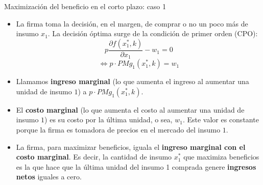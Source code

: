 \documentclass{beamer}
\theoremstyle{definition}
\begin{document}
\begin{frame}{Maximización del beneficio en el corto plazo: caso 1}\small
\begin{itemize}
	\item La firma toma la decisión, en el margen, de comprar o no un poco más de insumo $x_1$. La decisión óptima surge de la condición de primer orden (CPO):
	\begin{equation*}
	p\frac{\partial f(x_{1}^*,k)}{\partial x_{1}}-w_{1}=0
	\end{equation*}
	\begin{equation*}
	 \Leftrightarrow p\cdot PMg_{1}(x_1^*,k)=w_{1}
	\end{equation*}
	\item Llamamos \textbf{ingreso marginal} (lo que aumenta el ingreso al aumentar una unidad de insumo $1$) a $p\cdot PMg_{1}(x_1^*,k)$.
	\item El \textbf{costo marginal} (lo que aumenta el costo al aumentar una unidad de insumo $1$) es su costo por la última unidad, o sea, $w_1$. Este valor es constante porque la firma es tomadora de precios en el mercado del insumo $1$.
	\item La firma, para maximizar beneficios, iguala el \textbf{ingreso marginal con el costo marginal}. Es decir, la cantidad de insumo $x_1^*$ que maximiza beneficios es la que hace que la última unidad del insumo 1 comprada genere \textbf{ingresos netos} iguales a cero.
	\end{itemize}
	\end{frame}
	
\end{document}

